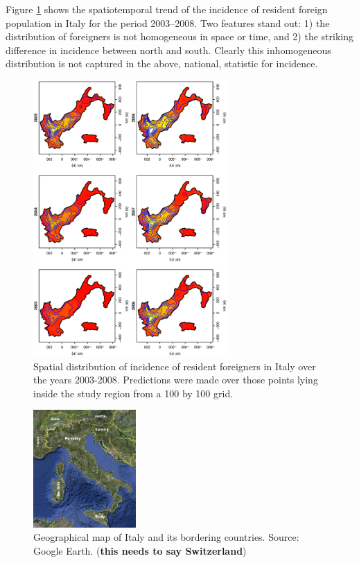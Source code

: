 \documentclass[10pt]{article}
\theoremstyle{definition}
\theoremstyle{plain}
\begin{document}
Figure \ref{fig2} shows the spatiotemporal trend of the incidence of resident foreign population in Italy for the period 2003--2008. Two features stand out: 1) the distribution of foreigners is not homogeneous in space or time, and 2) the striking difference in incidence between north and south. Clearly this inhomogeneous distribution is not captured in the above, national, statistic for incidence.

\begin{figure}[tbp]
	\centering
		\includegraphics[width=0.66\textwidth, angle=270]{SmoothPlot.eps}
	\caption{Spatial distribution of incidence of resident foreigners in Italy over the years 2003-2008. Predictions were made over those points lying inside the study region from a 100 by 100 grid.}
	\label{fig2}
\end{figure}


\begin{figure}[tbp]
	\centering
		\includegraphics[width=0.35\textwidth]{mapIT.eps}
	\caption{Geographical map of Italy and its bordering countries. Source: Google Earth. (\textbf{this needs to say Switzerland})  }
	\label{fig1}
\end{figure}
\end{document}
